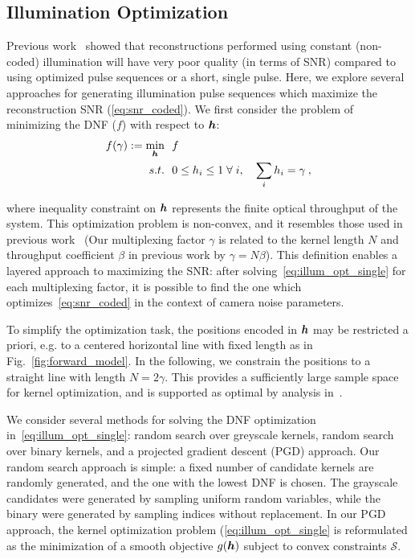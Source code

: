 \subsection{Illumination Optimization}\label{sec:illum_opt}
Previous work~\cite{raskar2006coded, agrawal2009optimal} showed that reconstructions performed using constant (non-coded) illumination will have very poor quality (in terms of SNR) compared to using optimized pulse sequences or a short, single pulse. Here, we explore several approaches for generating illumination pulse sequences which maximize the reconstruction SNR (\eqref{eq:snr_coded}). We first consider the problem of minimizing the DNF ($f$) with respect to $\bm{h}$:
\begin{align}
    \begin{split}
        \label{eq:illum_opt_single}
        f(\gamma) := \min_{\bm{h}}&~~ f \\
          s.t. &~~0 \leq h_i \leq 1 \; \forall \; i, \quad
          \sum_{i} h_i = \gamma \:,
    \end{split}
\end{align}

\noindent where inequality constraint on $\bm{h}$ represents the finite optical throughput of the system. 
This optimization problem is non-convex, and it resembles those used in previous work~\cite{raskar2006coded,agrawal2009optimal,Ma:15} (Our multiplexing factor $\gamma$ is related to the kernel length $N$ and throughput coefficient $\beta$ in previous work by $\gamma = N\beta$). This definition enables a layered approach to maximizing the SNR: after solving~\eqref{eq:illum_opt_single} for each multiplexing factor, it is possible to find the one which optimizes~\eqref{eq:snr_coded} in the context of camera noise parameters.

To simplify the optimization task, the positions encoded in $\bm{h}$ may be restricted a priori, e.g. to a centered horizontal line with fixed length as in Fig.~\ref{fig:forward_model}. In the following, we constrain the positions to a straight line with length $N=2\gamma$. This provides a sufficiently large sample space for kernel optimization, and is supported as optimal by analysis in~\cite{agrawal2009optimal}.

We consider several methods for solving the DNF optimization in~\eqref{eq:illum_opt_single}: random search over greyscale kernels, random search over binary kernels, and a projected gradient descent (PGD) approach. Our random search approach is simple: a fixed number of candidate kernels are randomly generated, and the one with the lowest DNF is chosen. The grayscale candidates were generated by sampling uniform random variables, while the binary were generated by sampling indices without replacement. In our PGD approach, the kernel optimization problem (\eqref{eq:illum_opt_single} is reformulated as the minimization of a smooth objective $g(\bm{h})$ subject to convex constraints $\mathcal{S}$.  

